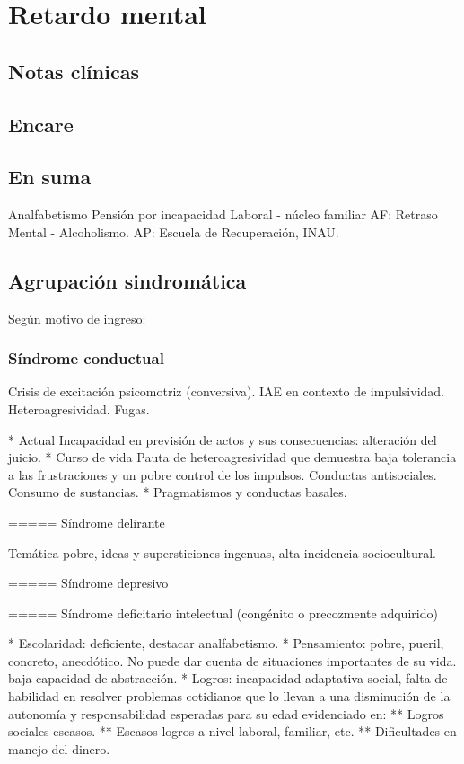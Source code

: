 \documentclass[encares.tex]{subfiles}
\begin{document}
\section*{Retardo mental}
\subsection*{Notas clínicas}
\subsection*{Encare}
\subsection*{En suma}
Analfabetismo Pensión por incapacidad Laboral - núcleo familiar AF: Retraso Mental - Alcoholismo. AP: Escuela de Recuperación, INAU.
\subsection*{Agrupación sindromática}
Según motivo de ingreso:
\subsubsection*{Síndrome conductual}
Crisis de excitación psicomotriz (conversiva). IAE en contexto de impulsividad. Heteroagresividad. Fugas.

* Actual Incapacidad en previsión de actos y sus consecuencias: alteración del juicio.
* Curso de vida Pauta de heteroagresividad que demuestra baja tolerancia a las frustraciones y un pobre control de los impulsos. Conductas antisociales. Consumo de sustancias.
* Pragmatismos y conductas basales.

===== Síndrome delirante

Temática pobre, ideas y supersticiones ingenuas, alta incidencia sociocultural.

===== Síndrome depresivo

===== Síndrome deficitario intelectual (congénito o precozmente adquirido)

* Escolaridad: deficiente, destacar analfabetismo.
* Pensamiento: pobre, pueril, concreto, anecdótico. No puede dar cuenta de situaciones importantes de su vida. baja capacidad de abstracción.
* Logros: incapacidad adaptativa social, falta de habilidad en resolver problemas cotidianos que lo llevan a una disminución de la autonomía y responsabilidad esperadas para su edad evidenciado en:
** Logros sociales escasos.
** Escasos logros a nivel laboral, familiar, etc.
** Dificultades en manejo del dinero.
\end{document}

